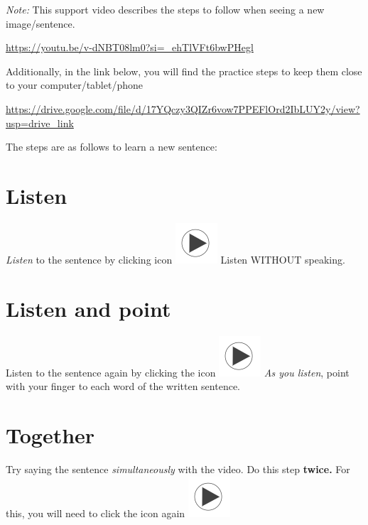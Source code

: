 \documentclass[
]{book}
\begin{document}
\emph{Note:} This support video describes the steps to follow when seeing a new image/sentence.

\url{https://youtu.be/v-dNBT08lm0?si=_ehTlVFt6bwPHegl}

Additionally, in the link below, you will find the practice steps to keep them close to your computer/tablet/phone

\url{https://drive.google.com/file/d/17YQczy3QIZr6vow7PPEFlOrd2IbLUY2y/view?usp=drive_link}

The steps are as follows to learn a new sentence:

\hypertarget{cross_6}{%
\section{Listen}\label{cross_6}}

\emph{Listen} to the sentence by clicking icon \includegraphics{images/play_icon.png} Listen WITHOUT speaking.

\hypertarget{listen-and-point}{%
\section{Listen and point}\label{listen-and-point}}

Listen to the sentence again by clicking the icon \includegraphics{images/play_icon.png} \emph{As you listen}, point with your finger to each word of the written sentence.

\hypertarget{together}{%
\section{Together}\label{together}}

Try saying the sentence \emph{simultaneously } with the video. Do this step \textbf{twice.} For this, you will need to click the icon again \includegraphics{images/play_icon.png}
\end{document}
